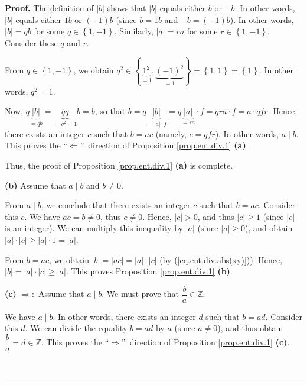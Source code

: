 \documentclass[numbers=enddot,12pt,final,onecolumn,notitlepage]{scrartcl}%
\numberwithin{exer}{subsection}
\theoremstyle{definition}
\newenvironment{proof}[1][Proof]{\noindent\textbf{#1.} }{\ \rule{0.5em}{0.5em}}
\begin{document}
\begin{proof}
The definition of $\left\vert b\right\vert $ shows that $\left\vert
b\right\vert $ equals either $b$ or $-b$. In other words, $\left\vert
b\right\vert $ equals either $1b$ or $\left(  -1\right)  b$ (since $b=1b$ and
$-b=\left(  -1\right)  b$). In other words, $\left\vert b\right\vert =qb$ for
some $q\in\left\{  1,-1\right\}  $. Similarly, $\left\vert a\right\vert =ra$
for some $r\in\left\{  1,-1\right\}  $. Consider these $q$ and $r$.

From $q\in\left\{  1,-1\right\}  $, we obtain $q^{2}\in\left\{
\underbrace{1^{2}}_{=1},\underbrace{\left(  -1\right)  ^{2}}_{=1}\right\}
=\left\{  1,1\right\}  =\left\{  1\right\}  $. In other words, $q^{2}=1$.

Now, $q\underbrace{\left\vert b\right\vert }_{=qb}=\underbrace{qq}_{=q^{2}%
=1}b=b$, so that $b=q\underbrace{\left\vert b\right\vert }_{=\left\vert
a\right\vert \cdot f}=q\underbrace{\left\vert a\right\vert }_{=ra}\cdot
f=qra\cdot f=a\cdot qfr$. Hence, there exists an integer $c$ such that $b=ac$
(namely, $c=qfr$). In other words, $a\mid b$. This proves the
\textquotedblleft$\Longleftarrow$\textquotedblright\ direction of Proposition
\ref{prop.ent.div.1} \textbf{(a)}.

Thus, the proof of Proposition \ref{prop.ent.div.1} \textbf{(a)} is complete.

\textbf{(b)} Assume that $a\mid b$ and $b\neq0$.

From $a\mid b$, we conclude that there exists an integer $c$ such that $b=ac$.
Consider this $c$. We have $ac=b\neq0$, thus $c\neq0$. Hence, $\left\vert
c\right\vert >0$, and thus $\left\vert c\right\vert \geq1$ (since $\left\vert
c\right\vert $ is an integer). We can multiply this inequality by $\left\vert
a\right\vert $ (since $\left\vert a\right\vert \geq0$), and obtain $\left\vert
a\right\vert \cdot\left\vert c\right\vert \geq\left\vert a\right\vert
\cdot1=\left\vert a\right\vert $.

From $b=ac$, we obtain $\left\vert b\right\vert =\left\vert ac\right\vert
=\left\vert a\right\vert \cdot\left\vert c\right\vert $ (by
(\ref{eq.ent.div.abs(xy)})). Hence, $\left\vert b\right\vert =\left\vert
a\right\vert \cdot\left\vert c\right\vert \geq\left\vert a\right\vert $. This
proves Proposition \ref{prop.ent.div.1} \textbf{(b)}.

\textbf{(c)} $\Longrightarrow:$ Assume that $a\mid b$. We must prove that
$\dfrac{b}{a}\in\mathbb{Z}$.

We have $a\mid b$. In other words, there exists an integer $d$ such that
$b=ad$. Consider this $d$. We can divide the equality $b=ad$ by $a$ (since
$a\neq0$), and thus obtain $\dfrac{b}{a}=d\in\mathbb{Z}$. This proves the
\textquotedblleft$\Longrightarrow$\textquotedblright\ direction of Proposition
\ref{prop.ent.div.1} \textbf{(c)}.


\end{proof}
\end{document}
